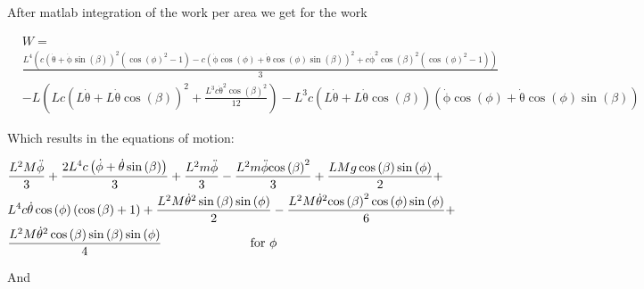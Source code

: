 After matlab integration of the work per area we get for the work

\begin{equation}
    \begin{split}
        &W = \\
        &\frac{L^4\left(c{\left(\mathrm{\dot\theta}+\mathrm{\dot\phi}\sin\left(\beta \right)\right)}^2\left({\cos\left(\phi \right)}^2-1\right)-c{\left(\mathrm{\dot\phi}\cos\left(\phi \right)+\mathrm{\dot\theta}\cos\left(\phi \right)\sin\left(\beta \right)\right)}^2+c{\mathrm{\dot\phi}}^2{\cos\left(\beta \right)}^2\left({\cos\left(\phi \right)}^2-1\right)\right)}{3}\\
        &-L\left(Lc{\left(L\mathrm{\dot\theta}+L\mathrm{\dot\theta}\cos\left(\beta \right)\right)}^2+\frac{L^3c{\mathrm{\dot\theta}}^2{\cos\left(\beta \right)}^2}{12}\right)-L^3c\left(L\mathrm{\dot\theta}+L\mathrm{\dot\theta}\cos\left(\beta \right)\right)\left(\mathrm{\dot\phi}\cos\left(\phi \right)+\mathrm{\dot\theta}\cos\left(\phi \right)\sin\left(\beta \right)\right)
    \end{split}
\end{equation}

Which results in the equations of motion:

\begin{equation}
    \begin{split}
        &\frac{L^2M\mathrm{\ddot\phi}}{3}+\frac{2L^4c\left(\mathrm{\dot\phi}+\mathrm{\dot\theta}\sin\left(\beta \right)\right)}{3}+\frac{L^2m\mathrm{\ddot\phi}}{3}-\frac{L^2m\mathrm{\ddot\phi}{\cos\left(\beta \right)}^2}{3}+\frac{LMg\cos\left(\beta \right)\sin\left(\phi \right)}{2}+\\
        &L^4c\mathrm{\dot\theta}\cos\left(\phi \right)\left(\cos\left(\beta \right)+1\right)+\frac{L^2M{\mathrm{\dot\theta}}^2\sin\left(\beta \right)\sin\left(\phi \right)}{2}-\frac{L^2M{\mathrm{\dot\theta}}^2{\cos\left(\beta \right)}^2\cos\left(\phi \right)\sin\left(\phi \right)}{6}+\\
        &\frac{L^2M{\mathrm{\dot\theta}}^2\cos\left(\beta \right)\sin\left(\beta \right)\sin\left(\phi \right)}{4}\hspace{25mm} \text{for } \phi
    \end{split}
\end{equation}

And 

